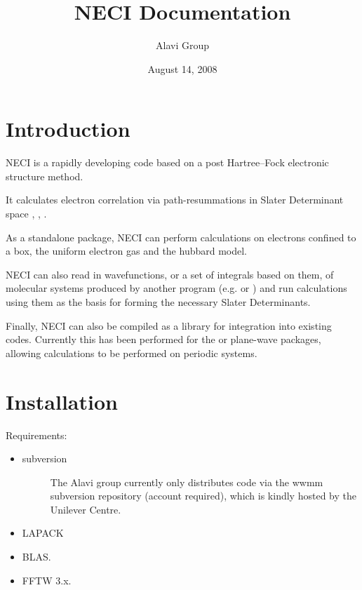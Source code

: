 \documentclass[openany,a4paper,10pt]{manual}
\title{NECI Documentation}
\date{August 14, 2008}
\author{Alavi Group}
\begin{document}
\maketitle
\tableofcontents



\resetcurrentobjects


\hypertarget{introduction}{}\chapter{Introduction}

NECI is a rapidly developing code based on a post Hartree--Fock electronic structure method.

It calculates electron correlation via path-resummations in Slater Determinant space \cite{SumPaper}, \cite{StarPaper}, \cite{ThomPhDThesis}.

As a standalone package, NECI can perform calculations on electrons confined to a box, the uniform electron gas and the hubbard model.

NECI can also read in wavefunctions, or a set of integrals based on them, of molecular systems produced by another program (e.g. \cite{DALTON} or \cite{MolPro}) and run calculations using them as the basis for forming the necessary Slater Determinants.

Finally, NECI can also be compiled as a library for integration into existing codes.  Currently this has been performed for the \cite{CPMD} or \cite{VASP} plane-wave packages, allowing calculations to be performed on periodic systems.

\resetcurrentobjects


\hypertarget{installation}{}\chapter{Installation}

Requirements:
\begin{itemize}
\item {} \begin{description}
\item[subversion]
The Alavi group currently only distributes code via the wwmm
subversion repository (account required), which is kindly hosted
by the Unilever Centre.

\end{description}

\item {} 
LAPACK

\item {} 
BLAS.

\item {} 
FFTW 3.x.

\end{itemize}
\end{document}
